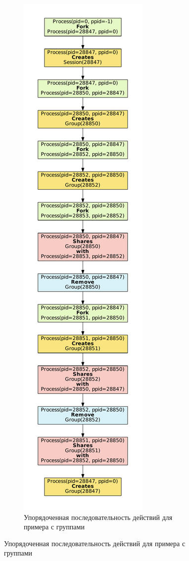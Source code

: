 \begin{figure}[ht!]
\begin{subfigure}[b]{0.25\textwidth}
		\includegraphics[width=\textwidth]{fig/exampleActSorted.pdf}
	\caption{Упорядоченная последовательность действий для примера с группами}
	\label{chap2:fig:groupssorted}
	\end{subfigure}
\end{figure}

